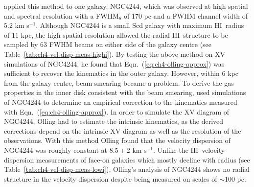 \documentclass[traditabstract]{aa} %
\newcommand\HI{H{\small I}}
\newcommand\kms{km s$^{-1}$}
\begin{document}
\citet{olling1996a} applied this method to one galaxy, NGC4244, which
was observed at high spatial and spectral resolution with a
FWHM$_{\theta}$ of $170$ pc and a FWHM channel width of $5.2$ \kms.
Although NGC4244 is a small Scd galaxy with maximum \HI\ radius of $11$
kpc, the high spatial resolution allowed the radial \HI\ structure to
be sampled by $63$ FWHM beams on either side of the galaxy centre (see
Table~\ref{tab:ch4-vel-disp-meas-highi}).  By testing the above method
on XV simulations of NGC4244, he found that
Eqn.~(\ref{eq:ch4-olling-approx}) was sufficient to recover the
kinematics in the outer galaxy. However, within $6$ kpc from the
galaxy centre, beam-smearing became a problem. To derive the gas 
properties in the inner disk consistent with the beam smearing, 
\citet{olling1996a} used simulations of NGC4244 to determine an 
empirical correction to the
kinematics measured with Eqn.~(\ref{eq:ch4-olling-approx}). In order to
simulate the XV diagram of NGC4244, Olling had to estimate the intrinsic
kinematics, as the derived corrections depend on the intrinsic XV diagram as
well as the resolution of the observations. With this method Olling
found that the velocity dispersion of NGC4244 was roughly constant at
$8.5\pm2$ \kms. Unlike the \HI\ velocity dispersion measurements of
face-on galaxies which mostly decline with radius (see
Table~\ref{tab:ch4-vel-disp-meas-lowi}), Olling's analysis of NGC4244
shows no radial structure in the velocity dispersion despite being
measured on scales of $\sim$100 pc.
\end{document}
